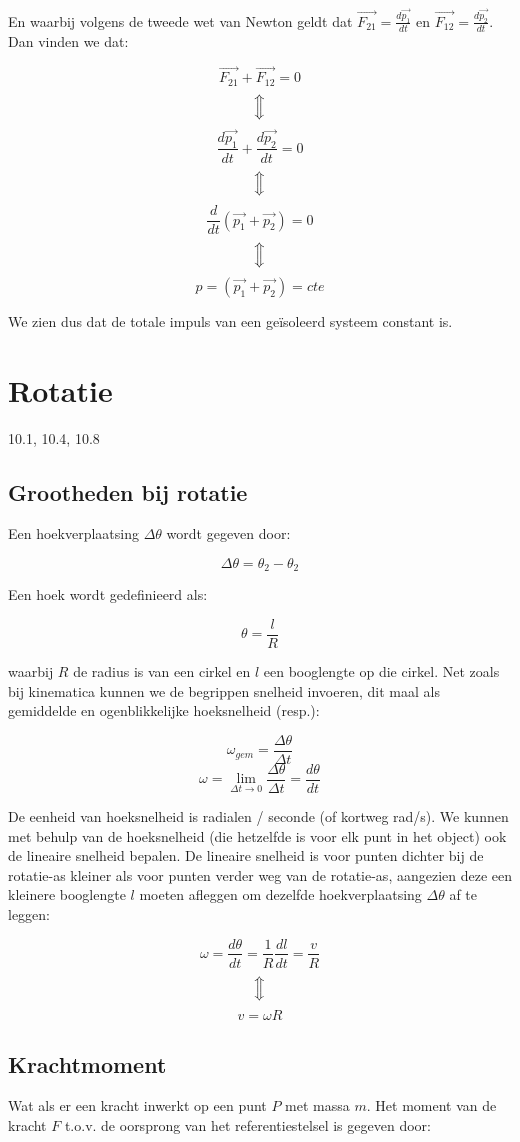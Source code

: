 \documentclass[12pt,a4paper]{article}
\newcommand{\Luda}{\Big\Updownarrow}
\begin{document}
    En waarbij volgens de tweede wet van Newton geldt dat $\vec{F_{21}} = \frac{d\vec{p_1}}{dt}$ en 
    $\vec{F_{12}} = \frac{d\vec{p_2}}{dt}$. Dan vinden we dat:
    
     $$\vec{F_{21}} + \vec{F_{12}} = 0$$
     $$\Luda$$
     $$\frac{d\vec{p_1}}{dt} + \frac{d\vec{p_2}}{dt} = 0$$
     $$\Luda$$
     $$\frac{d}{dt}(\vec{p_1} + \vec{p_2}) = 0$$
     $$\Luda$$
     $$p = (\vec{p_1} + \vec{p_2}) = cte$$

    We zien dus dat de totale impuls van een geïsoleerd systeem constant is. 

    \section{Rotatie}
    10.1, 10.4, 10.8
    
    \subsection{Grootheden bij rotatie}
    Een hoekverplaatsing $\Delta \theta$ wordt gegeven door:
    
    $$\Delta \theta = \theta_{2} - \theta_{2}$$
    
    Een hoek wordt gedefinieerd als:
    
    $$\theta = \frac{l}{R}$$ 
    
    waarbij $R$ de radius is van een cirkel en $l$ een booglengte op die cirkel. Net zoals bij kinematica kunnen we de begrippen
    snelheid invoeren, dit maal als gemiddelde en ogenblikkelijke hoeksnelheid (resp.):
    
    $$\omega_{gem} = \frac{\Delta \theta}{\Delta t}$$
    $$\omega = \lim_{\Delta t \to 0} \frac{\Delta \theta}{\Delta t} = \frac{d\theta}{dt}$$
    
    De eenheid van hoeksnelheid is radialen / seconde (of kortweg rad/s). We kunnen met behulp van de hoeksnelheid
    (die hetzelfde is voor elk punt in het object) ook de lineaire snelheid bepalen. De lineaire snelheid is voor punten dichter
    bij de rotatie-as kleiner als voor punten verder weg van de rotatie-as, aangezien deze een kleinere booglengte $l$
    moeten afleggen om dezelfde hoekverplaatsing $\Delta \theta$ af te leggen:
    
    $$\omega = \frac{d\theta}{dt} = \frac{1}{R} \frac{dl}{dt} = \frac{v}{R}$$
    $$\Luda$$
    $$v = \omega R$$

    \subsection{Krachtmoment}
    Wat als er een kracht inwerkt op een punt $P$ met massa $m$. Het moment van de kracht $F$ 
    t.o.v. de oorsprong van het referentiestelsel is gegeven door:
    
\end{document}
